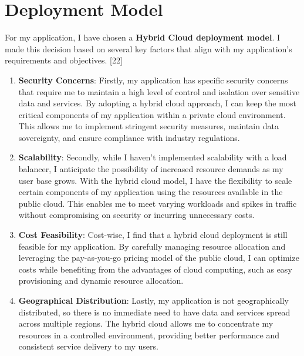 
\newpage

\clearpage

\chapter{Deployment Model}

For my application, I have chosen a \textbf{Hybrid Cloud deployment model}. I made this decision based on several key factors that align with my application's requirements and objectives. [22]

\begin{enumerate}
    \item \textbf{Security Concerns}: Firstly, my application has specific security concerns that require me to maintain a high level of control and isolation over sensitive data and services. By adopting a hybrid cloud approach, I can keep the most critical components of my application within a private cloud environment. This allows me to implement stringent security measures, maintain data sovereignty, and ensure compliance with industry regulations.

    \item \textbf{Scalability}: Secondly, while I haven't implemented scalability with a load balancer, I anticipate the possibility of increased resource demands as my user base grows. With the hybrid cloud model, I have the flexibility to scale certain components of my application using the resources available in the public cloud. This enables me to meet varying workloads and spikes in traffic without compromising on security or incurring unnecessary costs.
    
    \item \textbf{Cost Feasibility}: Cost-wise, I find that a hybrid cloud deployment is still feasible for my application. By carefully managing resource allocation and leveraging the pay-as-you-go pricing model of the public cloud, I can optimize costs while benefiting from the advantages of cloud computing, such as easy provisioning and dynamic resource allocation.
    
    \item \textbf{Geographical Distribution}: Lastly, my application is not geographically distributed, so there is no immediate need to have data and services spread across multiple regions. The hybrid cloud allows me to concentrate my resources in a controlled environment, providing better performance and consistent service delivery to my users.
\end{enumerate}

